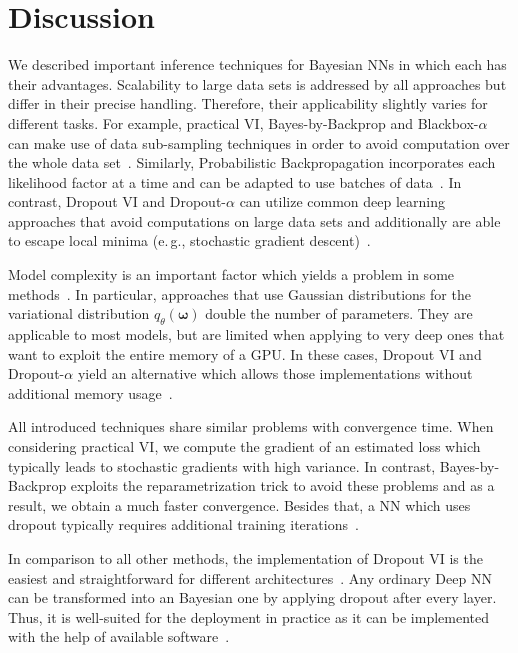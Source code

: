 \documentclass[runningheads]{llncs}
\begin{document}
\section{Discussion}
We described important inference techniques for Bayesian NNs in which each has their advantages.
Scalability to large data sets is addressed by all approaches but differ in their precise handling.
Therefore, their applicability slightly varies for different tasks.
For example, practical VI, Bayes-by-Backprop and Blackbox-$\alpha$ can make use of data sub-sampling techniques in order to avoid computation over the whole data set~\cite{Gal2016Uncertainty, li2017dropout}. 
Similarly, Probabilistic Backpropagation incorporates each likelihood factor at a time and can be adapted to use batches of data~\cite{hernandez2015probabilistic}.
In contrast, Dropout VI and Dropout-$\alpha$ can utilize common deep learning approaches that avoid computations on large data sets and additionally are able to escape local minima (e.\,g., stochastic gradient descent)~\cite{Gal2016Uncertainty}.

Model complexity is an important factor which yields a problem in some methods~\cite{Graves2011Practical, BlundellBBB, hernandez2015probabilistic}. 
In particular, approaches that use Gaussian distributions for the variational distribution $q_\theta(\boldsymbol{\omega})$ double the number of parameters.
They are applicable to most models, but are limited when applying to very deep ones that want to exploit the entire memory of a GPU.
In these cases, Dropout VI and Dropout-$\alpha$ yield an alternative which allows those implementations without additional memory usage~\cite{Gal2016Uncertainty}.

All introduced techniques share similar problems with convergence time.
When considering practical VI, we compute the gradient of an estimated loss which typically leads to stochastic gradients with high variance.
In contrast, Bayes-by-Backprop exploits the reparametrization trick to avoid these problems and as a result, we obtain a much faster convergence.
Besides that, a NN which uses dropout typically requires additional training iterations~\cite{krizhevsky2012imagenet}.

In comparison to all other methods, the implementation of Dropout VI is the easiest and straightforward for different architectures~\cite{Gal2016Uncertainty, Kendall2017Uncertainy}.
Any ordinary Deep NN can be transformed into an Bayesian one by applying dropout after every layer.
Thus, it is well-suited for the deployment in practice as it can be implemented with the help of available software~\cite{Kendall2017Uncertainy}.
\end{document}

